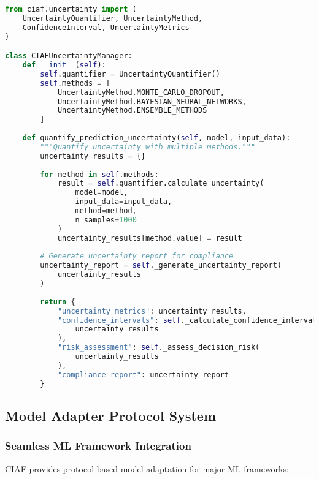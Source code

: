 \documentclass[12pt,a4paper]{article}
\begin{document}
\begin{lstlisting}[language=Python, caption=Uncertainty Quantification Implementation]
from ciaf.uncertainty import (
    UncertaintyQuantifier, UncertaintyMethod,
    ConfidenceInterval, UncertaintyMetrics
)

class CIAFUncertaintyManager:
    def __init__(self):
        self.quantifier = UncertaintyQuantifier()
        self.methods = [
            UncertaintyMethod.MONTE_CARLO_DROPOUT,
            UncertaintyMethod.BAYESIAN_NEURAL_NETWORKS,
            UncertaintyMethod.ENSEMBLE_METHODS
        ]
    
    def quantify_prediction_uncertainty(self, model, input_data):
        """Quantify uncertainty with multiple methods."""
        uncertainty_results = {}
        
        for method in self.methods:
            result = self.quantifier.calculate_uncertainty(
                model=model,
                input_data=input_data,
                method=method,
                n_samples=1000
            )
            uncertainty_results[method.value] = result
        
        # Generate uncertainty report for compliance
        uncertainty_report = self._generate_uncertainty_report(
            uncertainty_results
        )
        
        return {
            "uncertainty_metrics": uncertainty_results,
            "confidence_intervals": self._calculate_confidence_intervals(
                uncertainty_results
            ),
            "risk_assessment": self._assess_decision_risk(
                uncertainty_results
            ),
            "compliance_report": uncertainty_report
        }
\end{lstlisting}

\subsection{Model Adapter Protocol System}

\subsubsection{Seamless ML Framework Integration}

CIAF provides protocol-based model adaptation for major ML frameworks:
\end{document}
